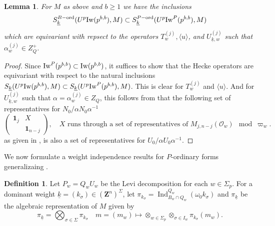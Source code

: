 \documentclass[leqno]{amsart}
\newcommand{\wt}[1]{\underline{ #1 }}
\newcommand{\Iw}{\textnormal{Iw}}
\newcommand{\ord}{\textnormal{ord}}
\newcommand{\id}{\mathbf{1}}
\newcommand{\Z}{{\mathbf{Z}}}
\newcommand{\oo}{\mathcal{O}} %
\DeclareMathOperator{\Ind}{Ind}
\newtheorem{lem}[thm]{Lemma}
\theoremstyle{definition}
\newtheorem{defn}[thm]{Definition}
\theoremstyle{remark}
\begin{document}
\begin{lem}
	For $M$ as above and $b\geq 1$ we have the inclusions 
	\begin{equation*}
		S_{\wt{k}}^{B-\ord}(U^p\Iw(p^{b,b}),M)\subset
		S_{\wt{k}}^{P-\ord}(U^p\Iw^P(p^{b,b}),M)
	\end{equation*}
	which are equivariant with repsect to 
	the operators $T_w^{(j)}, \langle u\rangle$,
	and $U_{\wt{k},w}^{(j)}$ 
	such that $\alpha_w^{(j)}\in Z_Q^+$.
\end{lem}
\begin{proof}
	Since $\Iw^P(p^{b,b})\subset \Iw(p^{b,b})$,
	it suffices to show that the Hecke operators 
	are equivariant with respect to the natural inclusions
	$S_{\wt{k}}(U^p\Iw(p^{b,b}),M)\subset 
	S_{\wt{k}}(U^p\Iw^P(p^{b,b}),M)$.
	This is clear for $T_w^{(j)}$ and $\langle u\rangle$.
	And for  $U_{\wt{k},w}^{(j)}$ such that 
	$\alpha=\alpha_w^{(j)}\in Z_Q$, this follows from that 
	the following set of representatives for 
	$N_0/\alpha N_0\alpha^{-1}$
	\[
	\begin{pmatrix}
		\id_j&X\\&\id_{n-j}
	\end{pmatrix},\quad
	X \text{ runs through a set of representatives of }
	M_{j,n-j}(\oo_w)\mod \varpi_w.
	\]
	as given in \cite[Lem 2.10]{ger}, is also
	a set of representatives for 
	$U_0/\alpha U_0\alpha^{-1}$.
\end{proof}


We now formulate a weight independence results 
for $P$-ordinary forms
generalizaing \cite[Prop 2.22]{ger}.

\begin{defn}
	Let $P_w=Q_wU_w$ be the Levi decomposition  
	for each  $w\in \Sigma_p$.
	For a dominant weight 
	$\wt{k}=(k_\sigma)\in (\Z^n)^{\Sigma}$,
	let $\pi_{k_\sigma}=
	\Ind_{B_w\cap Q_w}^{Q_w}(\omega_0 k_\sigma)$
	and $\pi_{\wt{k}}$ be the algebraic representation 
	of $M$ given by
	\[
		\pi_{\wt{k}}=\bigotimes_{\sigma\in \Sigma}
		\pi_{k_\sigma}\quad
		m=(m_w)\mapsto 
		\otimes_{w\in \Sigma_p}\otimes_{\sigma\in I_w}
		\pi_{k_\sigma}(m_w).
	\]
\end{defn}
\end{document}
